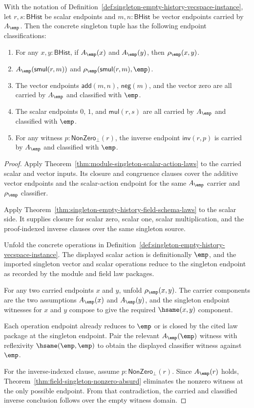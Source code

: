 \begin{theorem}
\label{thm:singleton-empty-history-vecspace-endpoint-collapse}
With the notation of
Definition~\ref{def:singleton-empty-history-vecspace-instance}, let
$r,s:\mathsf{BHist}$ be scalar endpoints and $m,n:\mathsf{BHist}$ be vector
endpoints carried by $A_{\emp}$. Then the concrete singleton tuple has the
following endpoint classifications:
\begin{enumerate}
  \item For any $x,y:\mathsf{BHist}$, if $A_{\emp}(x)$ and $A_{\emp}(y)$,
  then $\rho_{\emp}(x,y)$.
  \item $A_{\emp}(\mathsf{smul}(r,m))$ and
  $\rho_{\emp}(\mathsf{smul}(r,m),\emp)$.
  \item The vector endpoints $\mathsf{add}(m,n)$, $\mathsf{neg}(m)$, and
  the vector zero are all carried by $A_{\emp}$ and classified with $\emp$.
  \item The scalar endpoints $0$, $1$, and $\mathsf{mul}(r,s)$ are all
  carried by $A_{\emp}$ and classified with $\emp$.
  \item For any witness $p:\mathsf{NonZero}_{\bot}(r)$, the inverse endpoint
  $\mathsf{inv}(r,p)$ is carried by $A_{\emp}$ and classified with $\emp$.
\end{enumerate}
\end{theorem}
\begin{proof}
Apply Theorem~\ref{thm:module-singleton-scalar-action-laws} to the carried
scalar and vector inputs. Its closure and congruence clauses cover the
additive vector endpoints and the scalar-action endpoint for the same
$A_{\emp}$ carrier and $\rho_{\emp}$ classifier.

Apply Theorem~\ref{thm:singleton-empty-history-field-schema-laws} to the
scalar side. It supplies closure for scalar zero, scalar one, scalar
multiplication, and the proof-indexed inverse clauses over the same singleton
source.

Unfold the concrete operations in
Definition~\ref{def:singleton-empty-history-vecspace-instance}. The displayed
scalar action is definitionally $\emp$, and the imported singleton vector and
scalar operations reduce to the singleton endpoint as recorded by the module
and field law packages.

For any two carried endpoints $x$ and $y$, unfold
$\rho_{\emp}(x,y)$. The carrier components are the two assumptions
$A_{\emp}(x)$ and $A_{\emp}(y)$, and the singleton endpoint witnesses for
$x$ and $y$ compose to give the required $\hsame(x,y)$ component.

Each operation endpoint already reduces to $\emp$ or is closed by the cited
law package at the singleton endpoint. Pair the relevant
$A_{\emp}(\emp)$ witness with reflexivity $\hsame(\emp,\emp)$ to obtain the
displayed classifier witness against $\emp$.

For the inverse-indexed clause, assume
$p:\mathsf{NonZero}_{\bot}(r)$. Since $A_{\emp}(r)$ holds,
Theorem~\ref{thm:field-singleton-nonzero-absurd} eliminates the nonzero
witness at the only possible endpoint. From that contradiction, the carried
and classified inverse conclusion follows over the empty witness domain.
\end{proof}

